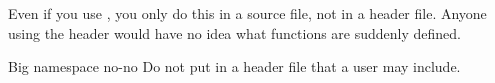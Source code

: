 Even if you use , you only do this in a source
file, not in a header file. Anyone using the header would have no idea what
functions are suddenly defined.

\begin{slide}{Big namespace no-no}
  \label{sl:h-no-using}
  Do not put  in a header file that a user may include.
\end{slide}
